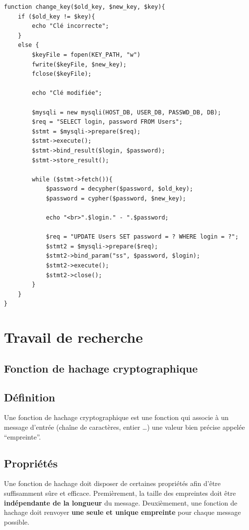 \documentclass[12pt, a4paper]{article}
\begin{document}
\begin{lstlisting}[name=Fonction de changement de clé]
function change_key($old_key, $new_key, $key){
    if ($old_key != $key){
        echo "Clé incorrecte";
    }
    else {
        $keyFile = fopen(KEY_PATH, "w")
        fwrite($keyFile, $new_key);
        fclose($keyFile);

        echo "Clé modifiée";
        
        $mysqli = new mysqli(HOST_DB, USER_DB, PASSWD_DB, DB);
        $req = "SELECT login, password FROM Users";
        $stmt = $mysqli->prepare($req);
        $stmt->execute();
        $stmt->bind_result($login, $password);
        $stmt->store_result();

        while ($stmt->fetch()){
            $password = decypher($password, $old_key);
            $password = cypher($password, $new_key);

            echo "<br>".$login." - ".$password;

            $req = "UPDATE Users SET password = ? WHERE login = ?";
            $stmt2 = $mysqli->prepare($req);
            $stmt2->bind_param("ss", $password, $login);
            $stmt2->execute();
            $stmt2->close();
        }
    }
}
\end{lstlisting}


\section{Travail de recherche}

\subsection{Fonction de hachage cryptographique}

\subsection*{Définition}
Une fonction de hachage cryptographique est une fonction qui associe à un message d'entrée
(chaîne de caractères, entier …) une valeur bien précise appelée “empreinte”.

\subsection*{Propriétés}\label{hash_properties}

Une fonction de hachage doit disposer de certaines propriétés afin d'être suffisamment sûre et efficace.
Premièrement, la taille des empreintes doit être \textbf{indépendante de la longueur} du message.
Deuxièmement, une fonction de hachage doit renvoyer \textbf{une seule et unique empreinte} pour chaque message possible.
\end{document}
